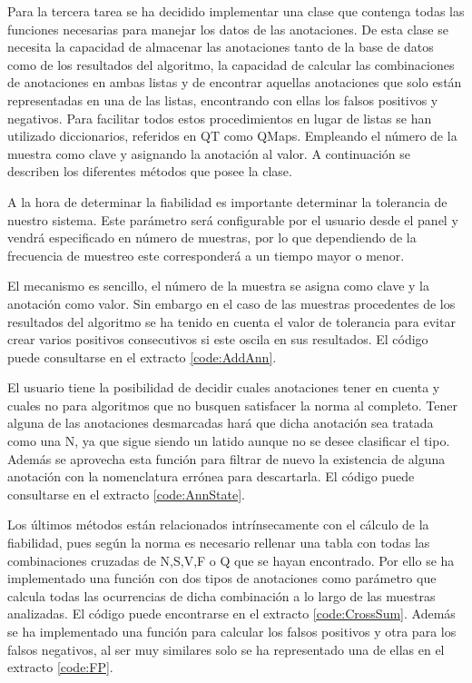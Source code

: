         Para la tercera tarea se ha decidido implementar una clase que contenga todas las funciones necesarias para manejar los datos de las anotaciones. De esta clase se necesita la capacidad de almacenar las anotaciones tanto de la base de datos como de los resultados del algoritmo, la capacidad de calcular las combinaciones de anotaciones en ambas listas y de encontrar aquellas anotaciones que solo están representadas en una de las listas, encontrando con ellas los falsos positivos y negativos. Para facilitar todos estos procedimientos en lugar de listas se han utilizado diccionarios, referidos en QT como QMaps. Empleando el número de la muestra como clave y asignando la anotación al valor. A continuación se describen los diferentes métodos que posee la clase.
        
        A la hora de determinar la fiabilidad es importante determinar la tolerancia de nuestro sistema. Este parámetro será configurable por el usuario desde el panel y vendrá especificado en número de muestras, por lo que dependiendo de la frecuencia de muestreo este corresponderá a un tiempo mayor o menor.

        El mecanismo es sencillo, el número de la muestra se asigna como clave y la anotación como valor. Sin embargo en el caso de las muestras procedentes de los resultados del algoritmo se ha tenido en cuenta el valor de tolerancia para evitar crear varios positivos consecutivos si este oscila en sus resultados. El código puede consultarse en el extracto \ref{code:AddAnn}.
        

        El usuario tiene la posibilidad de decidir cuales anotaciones tener en cuenta y cuales no para algoritmos que no busquen satisfacer la norma al completo. Tener alguna de las anotaciones desmarcadas hará que dicha anotación sea tratada como una N, ya que sigue siendo un latido aunque no se desee clasificar el tipo. Además se aprovecha esta función para filtrar de nuevo la existencia de alguna anotación con la nomenclatura errónea para descartarla. El código puede consultarse en el extracto \ref{code:AnnState}.
        
        
        Los últimos métodos están relacionados intrínsecamente con el cálculo de la fiabilidad, pues según la norma es necesario rellenar una tabla con todas las combinaciones cruzadas de N,S,V,F o Q que se hayan encontrado. Por ello se ha implementado una función con dos tipos de anotaciones como parámetro que calcula todas las ocurrencias de dicha combinación a lo largo de las muestras analizadas. El código puede encontrarse en el extracto \ref{code:CrossSum}. Además se ha implementado una función para calcular los falsos positivos y otra para los falsos negativos, al ser muy similares solo se ha representado una de ellas en el extracto \ref{code:FP}.
        
